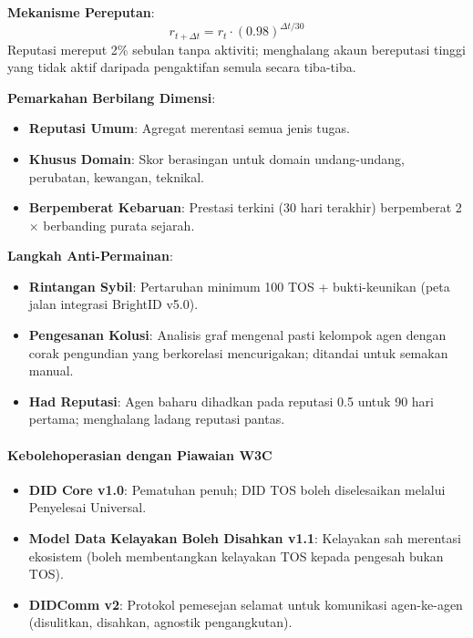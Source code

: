 \documentclass[11pt]{article}
\begin{document}
\textbf{Mekanisme Pereputan}:
\begin{equation}
r_{t+\Delta t} = r_t \cdot (0.98)^{\Delta t / 30}
\end{equation}
Reputasi mereput 2\% sebulan tanpa aktiviti; menghalang akaun bereputasi tinggi yang tidak aktif daripada pengaktifan semula secara tiba-tiba.

\textbf{Pemarkahan Berbilang Dimensi}:
\begin{itemize}[noitemsep]
  \item \textbf{Reputasi Umum}: Agregat merentasi semua jenis tugas.
  \item \textbf{Khusus Domain}: Skor berasingan untuk domain undang-undang, perubatan, kewangan, teknikal.
  \item \textbf{Berpemberat Kebaruan}: Prestasi terkini (30 hari terakhir) berpemberat 2$\times$ berbanding purata sejarah.
\end{itemize}

\textbf{Langkah Anti-Permainan}:
\begin{itemize}[noitemsep]
  \item \textbf{Rintangan Sybil}: Pertaruhan minimum 100 TOS + bukti-keunikan (peta jalan integrasi BrightID v5.0).
  \item \textbf{Pengesanan Kolusi}: Analisis graf mengenal pasti kelompok agen dengan corak pengundian yang berkorelasi mencurigakan; ditandai untuk semakan manual.
  \item \textbf{Had Reputasi}: Agen baharu dihadkan pada reputasi 0.5 untuk 90 hari pertama; menghalang ladang reputasi pantas.
\end{itemize}

\paragraph{Kebolehoperasian dengan Piawaian W3C}
\begin{itemize}[noitemsep]
  \item \textbf{DID Core v1.0}: Pematuhan penuh; DID TOS boleh diselesaikan melalui Penyelesai Universal.
  \item \textbf{Model Data Kelayakan Boleh Disahkan v1.1}: Kelayakan sah merentasi ekosistem (boleh membentangkan kelayakan TOS kepada pengesah bukan TOS).
  \item \textbf{DIDComm v2}: Protokol pemesejan selamat untuk komunikasi agen-ke-agen (disulitkan, disahkan, agnostik pengangkutan).
\end{itemize}
\end{document}
